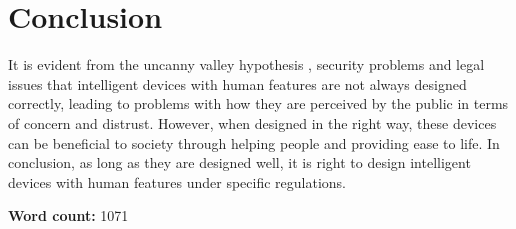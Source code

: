 \documentclass{article}
\begin{document}
\section{Conclusion}
It is evident from the uncanny valley hypothesis \cite{mori1970valley}, security problems and legal issues that intelligent devices with human features are not always designed correctly, leading to problems with how they are perceived by the public in terms of concern and distrust. However, when designed in the right way, these devices can be beneficial to society through helping people and providing ease to life. In conclusion, as long as they are designed well, it is right to design intelligent devices with human features under specific regulations.

\vspace{.5cm}
\noindent \textbf{Word count:} 1071



\end{document}
